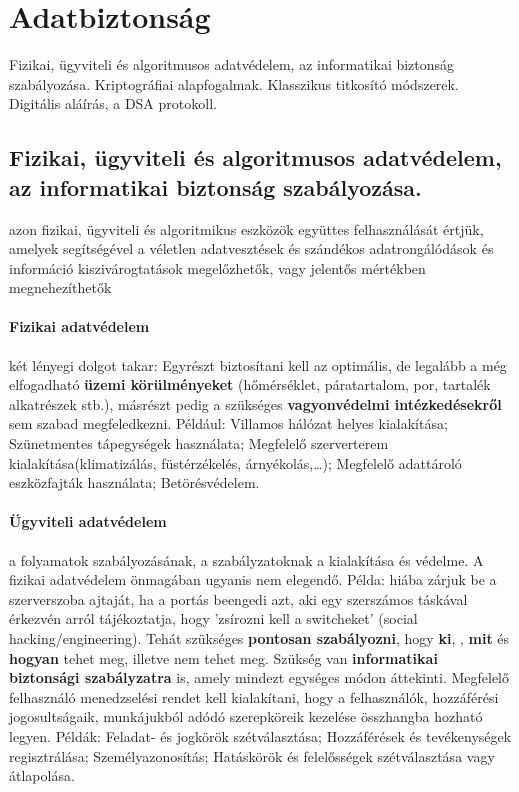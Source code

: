 \section{Adatbiztonság}
{\footnotesize Fizikai, ügyviteli és algoritmusos adatvédelem, az informatikai biztonság szabályozása. Kriptográfiai alapfogalmak. Klasszikus titkosító módszerek. Digitális aláírás, a DSA protokoll.}
\subsection{Fizikai, ügyviteli és algoritmusos adatvédelem, az informatikai biztonság szabályozása.}
\begin{definition}[Adatvédelem]
	azon fizikai, ügyviteli és algoritmikus eszközök együttes felhasználását értjük, amelyek segítségével a véletlen adatvesztések és szándékos adatrongálódások és információ kiszivárogtatások megelőzhetők, vagy jelentős mértékben megnehezíthetők
\end{definition}
\paragraph{Fizikai adatvédelem} két lényegi dolgot takar: Egyrészt biztosítani kell az optimális, de legalább a még elfogadható \textbf{üzemi körülményeket} (hőmérséklet, páratartalom, por, tartalék alkatrészek stb.), másrészt pedig a szükséges \textbf{vagyonvédelmi intézkedésekről} sem szabad megfeledkezni. Például: Villamos hálózat helyes kialakítása; Szünetmentes tápegységek használata; Megfelelő szerverterem kialakítása(klimatizálás, füstérzékelés, árnyékolás,\dots); Megfelelő adattároló eszközfajták használata; Betörésvédelem.

\paragraph{Ügyviteli adatvédelem} a folyamatok szabályozásának, a szabályzatoknak a kialakítása és védelme. A fizikai adatvédelem önmagában ugyanis nem elegendő. Példa: hiába zárjuk be a szerverszoba ajtaját, ha a portás beengedi azt, aki egy szerszámos táskával érkezvén arról tájékoztatja, hogy ’zsírozni kell a switcheket’ (social hacking/engineering). Tehát szükséges \textbf{pontosan szabályozni}, hogy \textbf{ki}, , \textbf{mit} és \textbf{hogyan} tehet meg, illetve nem tehet meg. Szükség van \textbf{informatikai biztonsági szabályzatra} is, amely mindezt egységes módon áttekinti. Megfelelő felhasználó menedzselési rendet kell kialakítani, hogy a felhasználók, hozzáférési jogosultságaik, munkájukból adódó szerepköreik kezelése összhangba hozható legyen. Példák: Feladat- és jogkörök szétválasztása; Hozzáférések és tevékenységek regisztrálása; Személyazonosítás; Hatáskörök és felelősségek szétválasztása vagy átlapolása.

